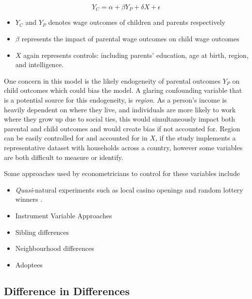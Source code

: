 \documentclass[../Main.tex]{subfiles}
\begin{document}
\begin{refsection}
\begin{equation}
Y_C = \alpha + \beta Y_P + \delta X + \epsilon
\end{equation}

\begin{itemize}
    \item $Y_C$ and $Y_P$ denotes wage outcomes of children and parents
    respectively
    
    \item $\beta$ represents the impact of parental wage outcomes on child wage
    outcomes
    
    \item $X$ again represents controls: including parents' education, age at
    birth, region, and intelligence. 
    
\end{itemize}

One concern in this model is the likely endogeneity of parental outcomes $Y_P$
on child outcomes which could bias the model. A glaring confounding variable
that is a potential source for this endogeneity, is \textit{region}. As a
person's income is heavily dependent on where they live, and individuals are
more likely to work where they grow up due to social ties, this would
simultaneously impact both parental and child outcomes and would create bias if
not accounted for. Region can be easily controlled for and accounted for in $X$,
if the study implements a representative dataset with households across a
country, however some variables are both difficult to measure or identify.

Some approaches used by econometricians to control for these variables include 
\begin{itemize}
    \item \textit{Quasi}-natural experiments such as local casino openings
    \autocite{akee_parents_2010} and random lottery winners
    \autocite{bleakley_shocking_2016}. 
    \item Instrument Variable Approaches 
    \item  Sibling differences 
    \item  Neighbourhood differences 
    \item  Adoptees 
\end{itemize}


\subsection{Difference in Differences}


\end{refsection}
\end{document}

